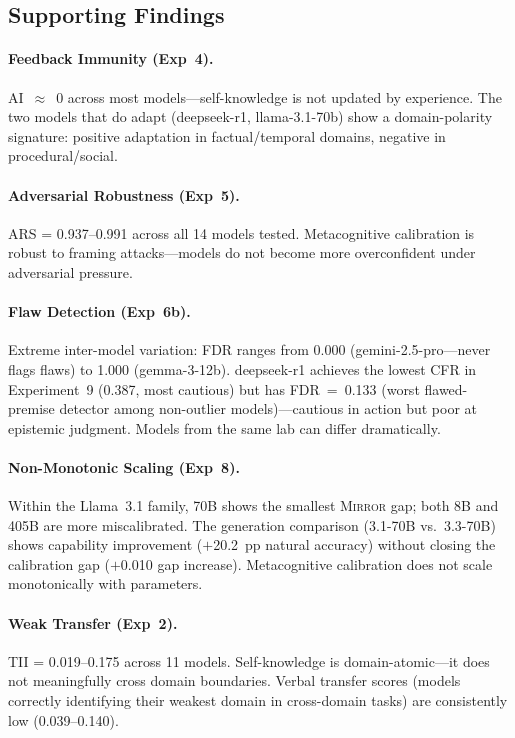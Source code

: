\documentclass[10pt]{article}
\newcommand{\mirror}{\textsc{Mirror}}
\newcommand{\ARS}{ARS}
\newcommand{\CFR}{CFR}
\newcommand{\FDR}{FDR}
\newcommand{\TII}{TII}
\newcommand{\AI}{AI}
\begin{document}
\subsection{Supporting Findings}

\paragraph{Feedback Immunity (Exp~4).}
\AI{}~$\approx$~0 across most models---self-knowledge is not updated by experience.
The two models that do adapt (deepseek-r1, llama-3.1-70b) show a domain-polarity
signature: positive adaptation in factual/temporal domains, negative in
procedural/social.

\paragraph{Adversarial Robustness (Exp~5).}
\ARS{} = 0.937--0.991 across all 14 models tested. Metacognitive calibration is
robust to framing attacks---models do not become more overconfident under
adversarial pressure.

\paragraph{Flaw Detection (Exp~6b).}
Extreme inter-model variation: \FDR{} ranges from 0.000 (gemini-2.5-pro---never
flags flaws) to 1.000 (gemma-3-12b). deepseek-r1 achieves the lowest \CFR{} in
Experiment~9 (0.387, most cautious) but has \FDR{}~=~0.133 (worst flawed-premise
detector among non-outlier models)---cautious in action but poor at epistemic
judgment. Models from the same lab can differ dramatically.

\paragraph{Non-Monotonic Scaling (Exp~8).}
Within the Llama~3.1 family, 70B shows the smallest \mirror{} gap; both 8B and
405B are more miscalibrated. The generation comparison (3.1-70B vs.\ 3.3-70B)
shows capability improvement ($+$20.2~pp natural accuracy) without closing the
calibration gap ($+$0.010 gap increase). Metacognitive calibration does not scale
monotonically with parameters.

\paragraph{Weak Transfer (Exp~2).}
\TII{} = 0.019--0.175 across 11 models. Self-knowledge is domain-atomic---it does
not meaningfully cross domain boundaries. Verbal transfer scores (models correctly
identifying their weakest domain in cross-domain tasks) are consistently low
(0.039--0.140).
\end{document}
